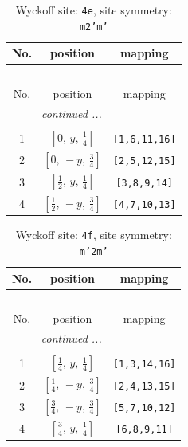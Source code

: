 \documentclass[fleqn,8pt]{jsarticle}
\begin{document}
\renewcommand{\arraystretch}{1.2}
\begin{longtable}{ccc}
\caption{Wyckoff site: {\tt 4e}, site symmetry: {\tt m2'm'}}
 \\
 \hline \hline
No. & position & mapping \\ \hline \endfirsthead

\multicolumn{2}{l}{\tablename\ \thetable{}} \\
 \hline \hline
No. & position & mapping \\ \hline \endhead

 \hline \hline
\multicolumn{2}{r}{\footnotesize\it continued ...} \\ \endfoot

 \hline \hline
\multicolumn{2}{r}{} \\ \endlastfoot

1 & $\left[ 0,\, y,\, \frac{1}{4} \right]$ & {\tt [1,6,11,16]} \\ \hline
2 & $\left[ 0,\, - y,\, \frac{3}{4} \right]$ & {\tt [2,5,12,15]} \\ \hline
3 & $\left[ \frac{1}{2},\, y,\, \frac{1}{4} \right]$ & {\tt [3,8,9,14]} \\ \hline
4 & $\left[ \frac{1}{2},\, - y,\, \frac{3}{4} \right]$ & {\tt [4,7,10,13]} \\
\end{longtable}
\renewcommand{\arraystretch}{1.2}
\begin{longtable}{ccc}
\caption{Wyckoff site: {\tt 4f}, site symmetry: {\tt m'2m'}}
 \\
 \hline \hline
No. & position & mapping \\ \hline \endfirsthead

\multicolumn{2}{l}{\tablename\ \thetable{}} \\
 \hline \hline
No. & position & mapping \\ \hline \endhead

 \hline \hline
\multicolumn{2}{r}{\footnotesize\it continued ...} \\ \endfoot

 \hline \hline
\multicolumn{2}{r}{} \\ \endlastfoot

1 & $\left[ \frac{1}{4},\, y,\, \frac{1}{4} \right]$ & {\tt [1,3,14,16]} \\ \hline
2 & $\left[ \frac{1}{4},\, - y,\, \frac{3}{4} \right]$ & {\tt [2,4,13,15]} \\ \hline
3 & $\left[ \frac{3}{4},\, - y,\, \frac{3}{4} \right]$ & {\tt [5,7,10,12]} \\ \hline
4 & $\left[ \frac{3}{4},\, y,\, \frac{1}{4} \right]$ & {\tt [6,8,9,11]} \\
\end{longtable}
\end{document}
